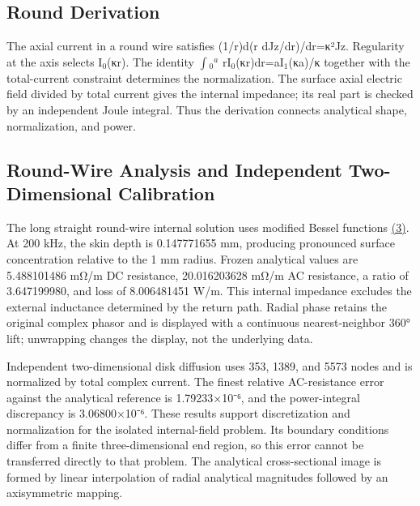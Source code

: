 \documentclass[journal,10pt]{IEEEtran}
\begin{document}
\subsection*{Round Derivation}
\hypertarget{03.round_derivation.heading}{}
The axial current in a round wire satisfies (1/r)d(r dJz/dr)/dr=κ²Jz. Regularity at the axis selects I\(_0\)(κr). The identity \(\int\)\(_0\)\(^a\) rI\(_0\)(κr)dr=aI\(_1\)(κa)/κ together with the total-current constraint determines the normalization. The surface axial electric field divided by total current gives the internal impedance; its real part is checked by an independent Joule integral. Thus the derivation connects analytical shape, normalization, and power.


\subsection*{Round-Wire Analysis and Independent Two-Dimensional Calibration}
\hypertarget{03.analytic.heading}{}
The long straight round-wire internal solution uses modified Bessel functions \href{report_en_ieee.pdf#E03}{(3)}. At 200 kHz, the skin depth is 0.147771655 mm, producing pronounced surface concentration relative to the 1 mm radius. Frozen analytical values are 5.488101486 mΩ/m DC resistance, 20.016203628 mΩ/m AC resistance, a ratio of 3.647199980, and loss of 8.006481451 W/m. This internal impedance excludes the external inductance determined by the return path. Radial phase retains the original complex phasor and is displayed with a continuous nearest-neighbor 360° lift; unwrapping changes the display, not the underlying data.


Independent two-dimensional disk diffusion uses 353, 1389, and 5573 nodes and is normalized by total complex current. The finest relative AC-resistance error against the analytical reference is 1.79233×10⁻⁶, and the power-integral discrepancy is 3.06800×10⁻⁶. These results support discretization and normalization for the isolated internal-field problem. Its boundary conditions differ from a finite three-dimensional end region, so this error cannot be transferred directly to that problem. The analytical cross-sectional image is formed by linear interpolation of radial analytical magnitudes followed by an axisymmetric mapping.
\end{document}
